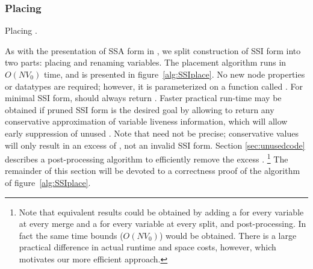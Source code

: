\documentclass[12pt,titlepage,twoside]{article}
\begin{document}
\subsubsection{Placing }\label{sec:SSIplace}
\begin{myalgorithm}\small

\caption{Placing .}\label{alg:SSIplace}
\end{myalgorithm}

As with the presentation of SSA form in \cite{cytron91:ssa}, we split
construction of SSI form into two parts: placing 
and renaming variables.  The placement algorithm runs in $O(N V_0)$
time, and is presented in figure~\vref{alg:SSIplace}.  No new node
properties or datatypes are required; however, it is parameterized on
a function called .  For minimal SSI form,
 should always return .  Faster practical
run-time may be obtained if pruned SSI form is the desired goal by
allowing  to return any conservative approximation of
variable liveness information, which will allow early suppression of
unused .  Note that  need not be
precise; conservative values will only result in an excess of
, not an invalid SSI form.  Section
\ref{sec:unusedcode} describes a post-processing algorithm to
efficiently remove the excess .%
\footnote{Note that equivalent results could be
obtained by adding a \phifunction{} for every variable at every merge
and a \sigfunction{} for every variable at every split, and
post-processing.  In fact the same time bounds ($O(N V_0)$) would be
obtained.  There is a large practical difference in actual runtime and
space costs, however, which motivates our more efficient approach.}
The remainder of this section will be devoted to a correctness proof
of the algorithm of figure~\ref{alg:SSIplace}.
\end{document}
